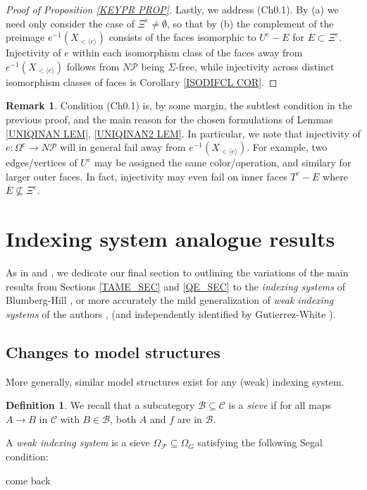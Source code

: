 \documentclass[a4paper,10pt
,draft
]{article}%
\numberwithin{equation}{section}
\numberwithin{figure}{section}
\theoremstyle{definition} %
\newtheorem{definition}[equation]{Definition}%
\newtheorem{remark}[equation]{Remark}%
\newcommand{\F}{\ensuremath{\mathcal F}}
\newcommand{\1}{\ensuremath{\mathbbm 1}}%
\begin{document}
\begin{proof}[Proof of Proposition \ref{KEYPR PROP}]
	
	Lastly, we address (Ch0.1). By (a) we need only consider the case of $\Xi^e \neq \emptyset$,
	so that by (b)
	the complement of
	the preimage
	$e^{-1}(X_{<\langle e\rangle})$
	consists of the faces isomorphic to
	$U^e-E$ for $E \subset \Xi^e$.
	Injectivity of $e$ within each isomorphism class of the faces away from %
	$e^{-1}(X_{<\langle e\rangle})$
	follows from $N \mathcal{P}$ being $\Sigma$-free,
	while injectivity across distinct isomorphism classes of faces is
	Corollary \ref{ISODIFCL COR}.
\end{proof}




\begin{remark}
	Condition (Ch0.1) is, by some margin, the subtlest condition in the previous proof, and the main reason for the chosen formulations of 
	Lemmas \ref{UNIQINAN LEM}, \ref{UNIQINAN2 LEM}.
	In particular, we note that injectivity of 
	$e \colon \Omega^e \to N \mathcal{P}$ will in general fail away from 
	$e^{-1}(X_{< \langle e \rangle})$.
	For example, two edges/vertices of $U^e$
	may be assigned the same color/operation, and similary for larger outer faces. In fact, injectivity may even fail on inner faces
	$T^e-E$ where $E \not \subseteq \Xi^e$.
\end{remark}














\section{Indexing system analogue results}\label{INDSYS SEC}

As in \cite[\S 6]{BP_edss} and \cite[\S 9]{Per18}, we dedicate our final section to 
outlining the variations of the main results from Sections \ref{TAME_SEC} and \ref{QE_SEC} to
the \textit{indexing systems} of Blumberg-Hill \cite{BH15}, or more accurately
the mild generalization of \textit{weak indexing systems} of the authors \cite[\S 9]{Per18}, \cite[\S4.4]{BP_geo} (and independently identified by Gutierrez-White \cite{GW18}).


\subsection{Changes to model structures}
More generally, similar model structures exist for any (weak) indexing system.
\begin{definition}
      We recall that a subcategory $\mathcal B \subseteq \mathcal C$ is a \textit{sieve} if for all maps $A \to B$ in $\mathcal C$
      with $B \in \mathcal B$, both $A$ and $f$ are in $\mathcal B$.

      A \textit{weak indexing system} is a sieve
      $\Omega_\F \subseteq \Omega_G$
      satisfying the following Segal condition:

      come back
\end{definition}
\end{document}
